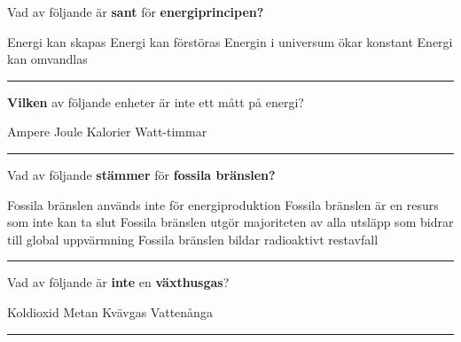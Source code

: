 \documentclass{exam}
\begin{document}
\vspace{5mm} %
\begin{center}
\end{center}
\vspace{5mm} %

\begin{questions}

\question Vad av följande är \textbf{sant} för \textbf{energiprincipen?}
\begin{checkboxes}
   \choice Energi kan skapas
   \choice Energi kan förstöras
   \choice Energin i universum ökar konstant
   \correctchoice Energi kan omvandlas
\end{checkboxes}

\vspace{5mm} 
\hrule 
\vspace{5mm} 

\question \textbf{Vilken} av följande enheter är inte ett mått på energi?
\begin{checkboxes}
   \correctchoice Ampere
   \choice Joule
   \choice Kalorier
   \choice Watt-timmar
\end{checkboxes}

\vspace{5mm} 
\hrule 
\vspace{5mm} 

\question Vad av följande \textbf{stämmer} för \textbf{fossila bränslen?}
\begin{checkboxes}
   \choice Fossila bränslen används inte för energiproduktion
   \choice Fossila bränslen är en resurs som inte kan ta slut
   \correctchoice Fossila bränslen utgör majoriteten av alla utsläpp som bidrar till global uppvärmning
   \choice Fossila bränslen bildar radioaktivt restavfall
\end{checkboxes}

\vspace{5mm} 
\hrule 
\vspace{5mm} 

\question Vad av följande är \textbf{inte} en \textbf{växthusgas}?
\begin{checkboxes}
   \choice Koldioxid
   \choice Metan
   \correctchoice Kvävgas
   \choice Vattenånga
\end{checkboxes}
\vspace{5mm} 
\hrule 
\vspace{5mm} 


\end{questions}
\end{document}

